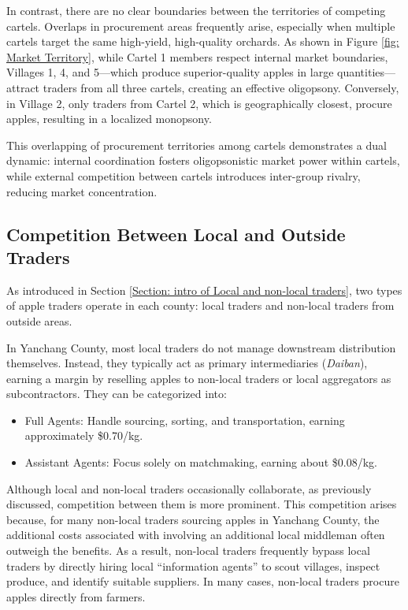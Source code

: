In contrast, there are no clear boundaries between the territories of competing cartels. Overlaps in procurement areas frequently arise, especially when multiple cartels target the same high-yield, high-quality orchards. As shown in Figure \ref{fig: Market Territory}, while Cartel 1 members respect internal market boundaries, Villages 1, 4, and 5—which produce superior-quality apples in large quantities—attract traders from all three cartels, creating an effective oligopsony. Conversely, in Village 2, only traders from Cartel 2, which is geographically closest, procure apples, resulting in a localized monopsony.

This overlapping of procurement territories among cartels demonstrates a dual dynamic: internal coordination fosters oligopsonistic market power within cartels, while external competition between cartels introduces inter-group rivalry, reducing market concentration. 



\subsection{Competition Between Local and Outside Traders}

As introduced in Section \ref{Section: intro of Local and non-local traders}, two types of apple traders operate in each county: local traders and non-local traders from outside areas.

In Yanchang County, most local traders do not manage downstream distribution themselves. Instead, they typically act as primary intermediaries (\textit{Daiban}), earning a margin by reselling apples to non-local traders or local aggregators as subcontractors. They can be categorized into:
\begin{itemize}
    \item Full Agents: Handle sourcing, sorting, and transportation, earning approximately \$0.70/kg.
    \item Assistant Agents: Focus solely on matchmaking, earning about \$0.08/kg.
\end{itemize}

Although local and non-local traders occasionally collaborate, as previously discussed, competition between them is more prominent. This competition arises because, for many non-local traders sourcing apples in Yanchang County, the additional costs associated with involving an additional local middleman often outweigh the benefits. As a result, non-local traders frequently bypass local traders by directly hiring local “information agents” to scout villages, inspect produce, and identify suitable suppliers. In many cases, non-local traders procure apples directly from farmers.

